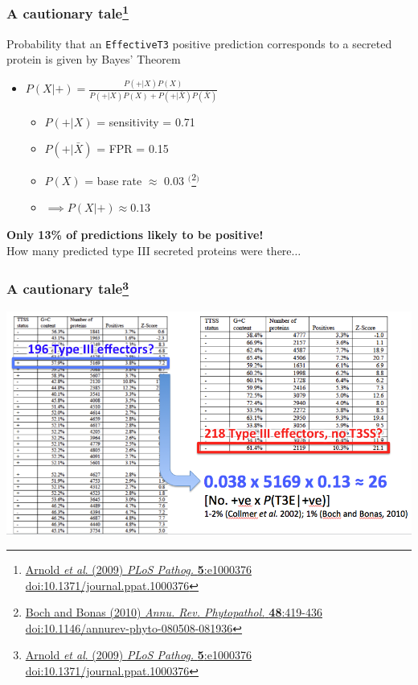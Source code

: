 \begin{frame}
  \frametitle{A cautionary tale\footnote{\tiny{\href{http://dx.doi.org/10.1371/journal.ppat.1000376}{Arnold \textit{et al}. (2009) \textit{PLoS Pathog.} \textbf{5}:e1000376 doi:10.1371/journal.ppat.1000376}}}}
    Probability that an \texttt{EffectiveT3} positive prediction corresponds to a secreted protein is given by Bayes' Theorem \\[0.2cm]
    \begin{itemize}
      \item $P(X|+) =  \frac{P(+|X) P(X)}{P(+|X) P(X) + P(+|\bar{X}) P(\bar{X})}$
      \begin{itemize}
        \item $P(+|X)$ = sensitivity = 0.71
        \item $P(+|\bar{X})$ = FPR = 0.15
        \item $P(X)$ = base rate $\approx$ 0.03 $^($\footnote{\tiny{\href{http://dx.doi.org/10.1146/annurev-phyto-080508-081936}{Boch and Bonas (2010) \textit{Annu. Rev. Phytopathol.} \textbf{48}:419-436 doi:10.1146/annurev-phyto-080508-081936}}}$^)$
        \item $\implies P(X|+) \approx 0.13$
      \end{itemize}
    \end{itemize}
  \textbf{Only 13\% of predictions likely to be positive!}\\[0.1cm]
  How many predicted type III secreted proteins were there$\ldots$
\end{frame}

\begin{frame}
  \frametitle{A cautionary tale\footnote{\tiny{\href{http://dx.doi.org/10.1371/journal.ppat.1000376}{Arnold \textit{et al}. (2009) \textit{PLoS Pathog.} \textbf{5}:e1000376 doi:10.1371/journal.ppat.1000376}}}}
  \begin{center}
    \includegraphics[height=0.65\textheight]{images/arnold_results}  
  \end{center}
\end{frame}


